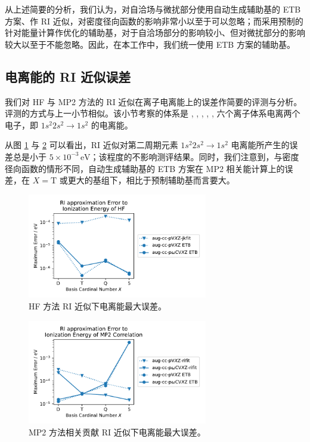 从上述简要的分析，我们认为，对自洽场与微扰部分使用自动生成辅助基的 ETB 方案、作 RI 近似，对密度径向函数的影响非常小以至于可以忽略；而采用预制的针对能量计算作优化的辅助基，对于自洽场部分的影响较小、但对微扰部分的影响较大以至于不能忽略。因此，在本工作中，我们统一使用 ETB 方案的辅助基。

\subsection{电离能的 RI 近似误差}

我们对 HF 与 MP2 方法的 RI 近似在离子电离能上的误差作简要的评测与分析。评测的方式与上一小节相似。该小节考察的体系是 , , , , ,  六个离子体系电离两个电子，即 $1s^2 2s^2 \rightarrow 1s^2$ 的电离能。

从图 \ref{fig.4.HF-RI-eng} 与 \ref{fig.4.MP2-RI-eng} 可以看出，RI 近似对第二周期元素 $1s^2 2s^2 \rightarrow 1s^2$ 电离能所产生的误差总是小于 $5 \times 10^{-3} \, \text{eV}$；该程度的不影响测评结果。同时，我们注意到，与密度径向函数的情形不同，自动生成辅助基的 ETB 方案在 MP2 相关能计算上的误差，在 $X=\mathrm{T}$ 或更大的基组下，相比于预制辅助基而言要大。

\begin{figure}[t]
    \centering
    \includegraphics[width=0.7\textwidth]{assets/HF-RI-eng.pdf}
    \caption{HF 方法 RI 近似下电离能最大误差。}
    \label{fig.4.HF-RI-eng}
\end{figure}

\begin{figure}[t]
    \centering
    \includegraphics[width=0.7\textwidth]{assets/MP2-RI-eng.pdf}
    \caption{MP2 方法相关贡献 RI 近似下电离能最大误差。}
    \label{fig.4.MP2-RI-eng}
\end{figure}

